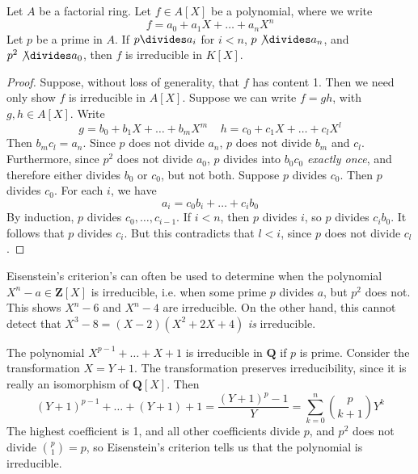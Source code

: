 \begin{theorem}[Eisenstein]
    Let $A$ be a factorial ring. Let $f \in A[X]$ be a polynomial, where we write
    \[ f = a_0 + a_1 X + \dots + a_n X^n \]
    Let $p$ be a prime in $A$. If $p \divides a_i$ for $i < n$, $p \not \divides a_n$, and $p^2 \not \divides a_0$, then $f$ is irreducible in $K[X]$.
\end{theorem}
\begin{proof}
    Suppose, without loss of generality, that $f$ has content 1. Then we need only show $f$ is irreducible in $A[X]$. Suppose we can write $f = gh$, with $g, h \in A[X]$. Write
    \[ g = b_0 + b_1 X + \dots + b_m X^m\ \ \ \ \ h = c_0 + c_1 X + \dots + c_l X^l \]
    Then $b_m c_l = a_n$. Since $p$ does not divide $a_n$, $p$ does not divide $b_m$ and $c_l$. Furthermore, since $p^2$ does not divide $a_0$, $p$ divides into $b_0c_0$ {\it exactly once}, and therefore either divides $b_0$ or $c_0$, but not both. Suppose $p$ divides $c_0$. Then $p$ divides $c_0$. For each $i$, we have
    \[ a_i = c_0 b_i + \dots + c_i b_0 \]
    By induction, $p$ divides $c_0, \dots, c_{i-1}$. If $i < n$, then $p$ divides $i$, so $p$ divides $c_i b_0$. It follows that $p$ divides $c_i$. But this contradicts that $l < i$, since $p$ does not divide $c_l$.
\end{proof}

\begin{example}
	Eisenstein's criterion's can often be used to determine when the polynomial $X^n - a \in \mathbf{Z}[X]$ is irreducible, i.e. when some prime $p$ divides $a$, but $p^2$ does not. This shows $X^n - 6$ and $X^n - 4$ are irreducible. On the other hand, this cannot detect that $X^3 - 8 = (X - 2)(X^2 + 2X + 4)$ {\it is} irreducible.
\end{example}

\begin{example}
    The polynomial $X^{p-1} + \dots + X + 1$ is irreducible in $\mathbf{Q}$ if $p$ is prime. Consider the transformation $X = Y + 1$. The transformation preserves irreducibility, since it is really an isomorphism of $\mathbf{Q}[X]$. Then
    \[ (Y + 1)^{p-1} + \dots + (Y + 1) + 1 = \frac{(Y + 1)^p - 1}{Y} = \sum_{k = 0}^n \binom{p}{k+1} Y^k \]
    The highest coefficient is 1, and all other coefficients divide $p$, and $p^2$ does not divide $\binom{p}{1} = p$, so Eisenstein's criterion tells us that the polynomial is irreducible.
\end{example}

